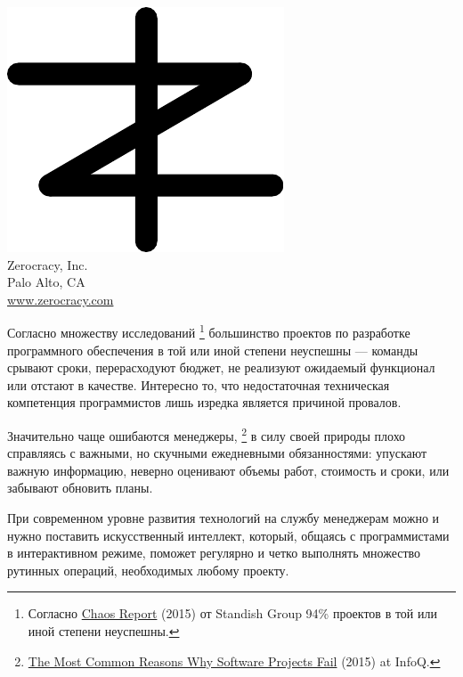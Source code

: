 \documentclass{article}
\begin{document}

\pagecolor{white}
\newcommand\slide[1]{%
  \pagebreak\topskip0pt\vspace*{\fill}%
  \begin{center}\huge%
  #1
  \end{center}%
  \vspace*{\fill}%
}

\slide{\includegraphics[scale=1]{../images/zerocracy-logo.pdf}\\
Zerocracy, Inc.\\[1em]
\large Palo Alto, CA\\
\large \href{https://www.zerocracy.com}{www.zerocracy.com}}

\slide{Согласно множеству исследований%
\footnote{%
  Согласно \href{https://www.projectsmart.co.uk/white-papers/chaos-report.pdf}{Chaos Report} (2015)
  от Standish Group 94\% проектов в той или иной степени неуспешны.
}
большинство проектов по разработке программного обеспечения
в той или иной степени неуспешны --- команды срывают сроки, перерасходуют бюджет, не реализуют
ожидаемый функционал или отстают в качестве. Интересно то, что недостаточная техническая
компетенция программистов лишь изредка является
причиной провалов.}

\slide{Значительно чаще ошибаются менеджеры,%
\footnote{%
  \href{https://www.infoq.com/articles/software-failure-reasons}{The Most Common Reasons Why Software Projects Fail}
  (2015) at InfoQ.
}
в силу своей природы плохо справляясь с важными, но скучными ежедневными обязанностями:
упускают важную информацию, неверно оценивают объемы работ, стоимость и сроки,
или забывают обновить планы.}

\slide{При современном уровне развития технологий на службу менеджерам можно и нужно поставить
искусственный интеллект, который, общаясь с программистами в интерактивном режиме,
поможет регулярно и четко выполнять множество рутинных операций, необходимых
любому проекту.}
\end{document}

